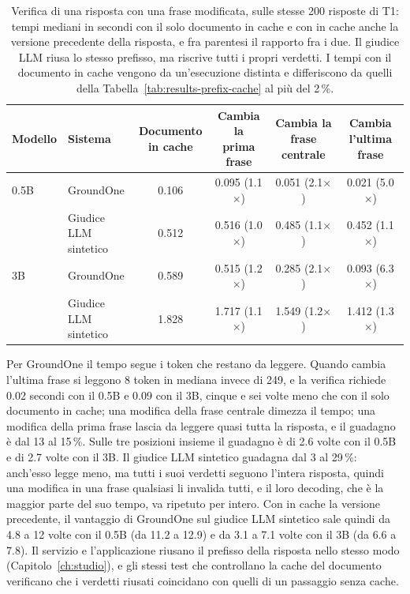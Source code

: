 \begin{table}[htbp]
\centering
\caption{Verifica di una risposta con una frase modificata, sulle stesse 200 risposte di T1: tempi mediani in secondi con
il solo documento in cache e con in cache anche la versione precedente della risposta, e fra parentesi il rapporto fra i
due. Il giudice LLM riusa lo stesso prefisso, ma riscrive tutti i propri verdetti. I tempi con il documento in cache vengono da un'esecuzione distinta e differiscono da quelli della Tabella~\ref{tab:results-prefix-cache} al più del 2\,\%.}
\label{tab:results-answer-prefix}
\small
\setlength{\tabcolsep}{4pt}
\begin{tabular}{llcccc}
\toprule
Modello & Sistema & \makecell{Documento\\in cache} & \makecell{Cambia la\\prima frase} & \makecell{Cambia la\\frase centrale} & \makecell{Cambia\\l'ultima frase} \\
\midrule
0.5B & GroundOne & 0.106 & 0.095 (1.1$\times$) & 0.051 (2.1$\times$) & 0.021 (5.0$\times$) \\
 & \makecell[l]{Giudice LLM\\sintetico} & 0.512 & 0.516 (1.0$\times$) & 0.485 (1.1$\times$) & 0.452 (1.1$\times$) \\
\midrule
3B & GroundOne & 0.589 & 0.515 (1.2$\times$) & 0.285 (2.1$\times$) & 0.093 (6.3$\times$) \\
 & \makecell[l]{Giudice LLM\\sintetico} & 1.828 & 1.717 (1.1$\times$) & 1.549 (1.2$\times$) & 1.412 (1.3$\times$) \\
\bottomrule
\end{tabular}
\end{table}

Per GroundOne il tempo segue i token che restano da leggere. Quando cambia l'ultima frase si leggono 8 token in mediana
invece di 249, e la verifica richiede 0.02 secondi con il 0.5B e 0.09 con il 3B, cinque e sei volte meno che con il solo
documento in cache; una modifica della frase centrale dimezza il tempo; una modifica della prima frase lascia da leggere
quasi tutta la risposta, e il guadagno è dal 13 al 15\,\%. Sulle tre posizioni insieme il guadagno è di 2.6 volte con il
0.5B e di 2.7 volte con il 3B. Il giudice LLM sintetico guadagna dal 3 al 29\,\%: anch'esso legge meno, ma tutti i suoi
verdetti seguono l'intera risposta, quindi una modifica in una frase qualsiasi li invalida tutti, e il loro decoding, che
è la maggior parte del suo tempo, va ripetuto per intero. Con in cache la versione precedente, il vantaggio di GroundOne
sul giudice LLM sintetico sale quindi da 4.8 a 12 volte con il 0.5B (da 11.2 a 12.9) e da 3.1 a 7.1 volte con il 3B (da
6.6 a 7.8). Il servizio e l'applicazione riusano il prefisso della risposta nello stesso modo (Capitolo~\ref{ch:studio}),
e gli stessi test che controllano la cache del documento verificano che i verdetti riusati coincidano con quelli di un
passaggio senza cache.

